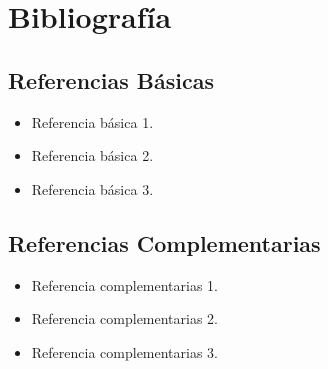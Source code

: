 \section{Bibliografía}

\subsection*{Referencias Básicas}

\begin{itemize}
    \item Referencia básica 1.
    \item Referencia básica 2.
    \item Referencia básica 3.
\end{itemize}

\subsection*{Referencias Complementarias}

\begin{itemize}
    \item Referencia complementarias 1.
    \item Referencia complementarias 2.
    \item Referencia complementarias 3.
\end{itemize}